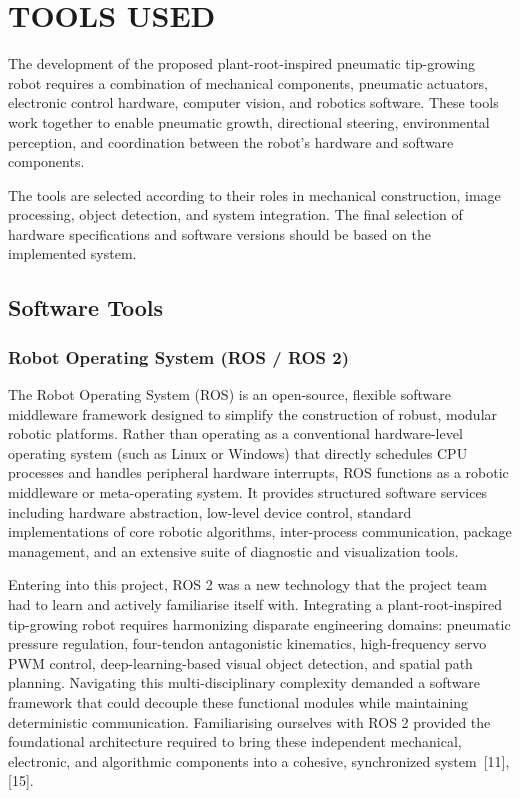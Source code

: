 \chapter{TOOLS USED}

The development of the proposed plant-root-inspired pneumatic tip-growing robot requires a combination of mechanical components, pneumatic actuators, electronic control hardware, computer vision, and robotics software. These tools work together to enable pneumatic growth, directional steering, environmental perception, and coordination between the robot's hardware and software components.

The tools are selected according to their roles in mechanical construction, image processing, object detection, and system integration. The final selection of hardware specifications and software versions should be based on the implemented system.

\section{Software Tools}

\subsection{Robot Operating System (ROS / ROS 2)}

The Robot Operating System (ROS) is an open-source, flexible software middleware framework designed to simplify the construction of robust, modular robotic platforms. Rather than operating as a conventional hardware-level operating system (such as Linux or Windows) that directly schedules CPU processes and handles peripheral hardware interrupts, ROS functions as a robotic middleware or meta-operating system. It provides structured software services including hardware abstraction, low-level device control, standard implementations of core robotic algorithms, inter-process communication, package management, and an extensive suite of diagnostic and visualization tools.

Entering into this project, ROS 2 was a new technology that the project team had to learn and actively familiarise itself with. Integrating a plant-root-inspired tip-growing robot requires harmonizing disparate engineering domains: pneumatic pressure regulation, four-tendon antagonistic kinematics, high-frequency servo PWM control, deep-learning-based visual object detection, and spatial path planning. Navigating this multi-disciplinary complexity demanded a software framework that could decouple these functional modules while maintaining deterministic communication. Familiarising ourselves with ROS 2 provided the foundational architecture required to bring these independent mechanical, electronic, and algorithmic components into a cohesive, synchronized system~[11], [15].

